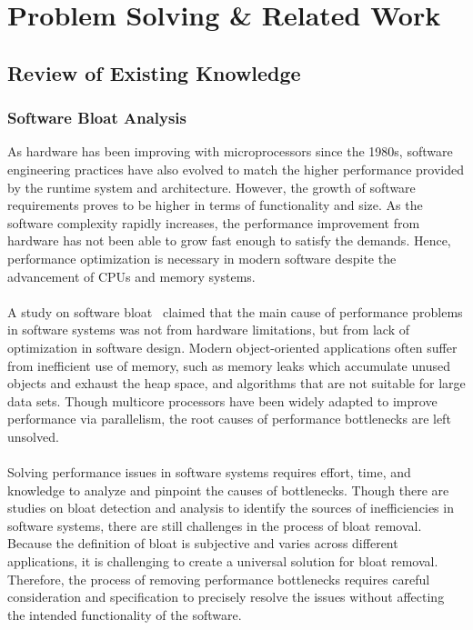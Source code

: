 \section{Problem Solving \& Related Work}
\label{sec:problem-solving-related-work}

\subsection{Review of Existing Knowledge}
\label{subsec:review-of-existing-knowledge}

\subsubsection*{Software Bloat Analysis}

As hardware has been improving with microprocessors since the 1980s, software engineering practices have
also evolved to match the higher performance provided by the runtime system and architecture.
However, the growth of software requirements proves to be higher in terms of functionality and size.
As the software complexity rapidly increases, the performance improvement from hardware has not been 
able to grow fast enough to satisfy the demands.
Hence, performance optimization is necessary in modern software despite the advancement of CPUs and 
memory systems.
\\\\
A study on software bloat~\cite{Software_Bloat_Analysis} claimed that the main cause of performance 
problems in software systems was not from hardware limitations, but from lack of optimization in software design.
Modern object-oriented applications often suffer from inefficient use of memory, such as memory leaks 
which accumulate unused objects and exhaust the heap space, and algorithms that are not suitable for 
large data sets.
Though multicore processors have been widely adapted to improve performance via parallelism, the root
causes of performance bottlenecks are left unsolved.
\\\\
Solving performance issues in software systems requires effort, time, and knowledge to analyze and 
pinpoint the causes of bottlenecks.
Though there are studies on bloat detection and analysis to identify the sources of inefficiencies 
in software systems, there are still challenges in the process of bloat removal.
Because the definition of bloat is subjective and varies across different applications, it is challenging
to create a universal solution for bloat removal.
Therefore, the process of removing performance bottlenecks requires careful consideration and specification 
to precisely resolve the issues without affecting the intended functionality of the software.

